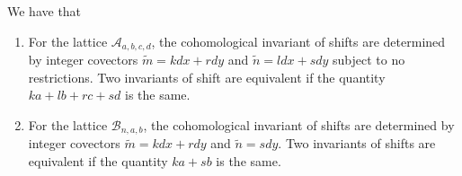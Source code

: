 \begin{theorem}\label{thm:invar-calculation}
    We have that
    \begin{enumerate}
        \item For the lattice $\mathcal{A}_{a,b,c,d}$, the cohomological invariant of shifts
              are determined by integer covectors $\tilde{m} = kdx + rdy$ and $\tilde{n} =
                  ldx + sdy$ subject to no restrictions. Two invariants of shift are equivalent
              if the quantity $ka+lb+rc+sd$ is the same.
        \item  For the lattice $\mathcal{B}_{n,a,b}$, the cohomological invariant of shifts
              are determined by integer covectors $\tilde{m} = kdx + rdy$ and $\tilde{n} =
                  sdy$. Two invariants of shifts are equivalent if the quantity $ka+sb$ is the
              same.
    \end{enumerate}
\end{theorem}

